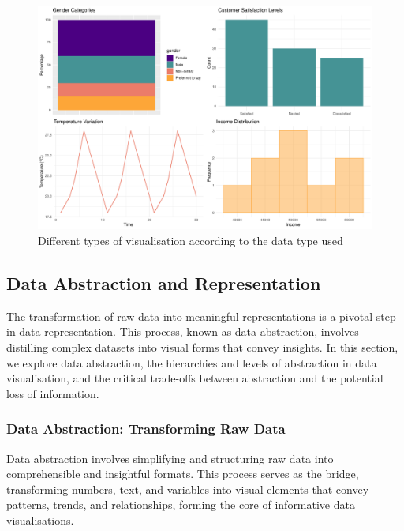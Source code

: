 \documentclass{article}\usepackage[]{graphicx}\usepackage[]{xcolor}
\makeatletter
\def\maxwidth{ %
  \ifdim\Gin@nat@width>\linewidth
    \linewidth
  \else
    \Gin@nat@width
  \fi
}
\newenvironment{knitrout}{}{} %
\makeatother
\begin{document}
\begin{knitrout}\scriptsize
{}\color{fgcolor}\begin{figure}[H]

{\centering \includegraphics[width=\maxwidth]{figure/beamer-data-plots-1} 

}

\caption[Different types of visualisation according to the data type used]{Different types of visualisation according to the data type used}\label{fig:data-plots}
\end{figure}

\end{knitrout}



\subsection{Data Abstraction and Representation}
The transformation of raw data into meaningful representations is a pivotal step in data representation. This process, known as data abstraction, involves distilling complex datasets into visual forms that convey insights. In this section, we explore data abstraction, the hierarchies and levels of abstraction in data visualisation, and the critical trade-offs between abstraction and the potential loss of information.

\subsubsection{Data Abstraction: Transforming Raw Data}
Data abstraction involves simplifying and structuring raw data into comprehensible and insightful formats. This process serves as the bridge, transforming numbers, text, and variables into visual elements that convey patterns, trends, and relationships, forming the core of informative data visualisations.
\end{document}
